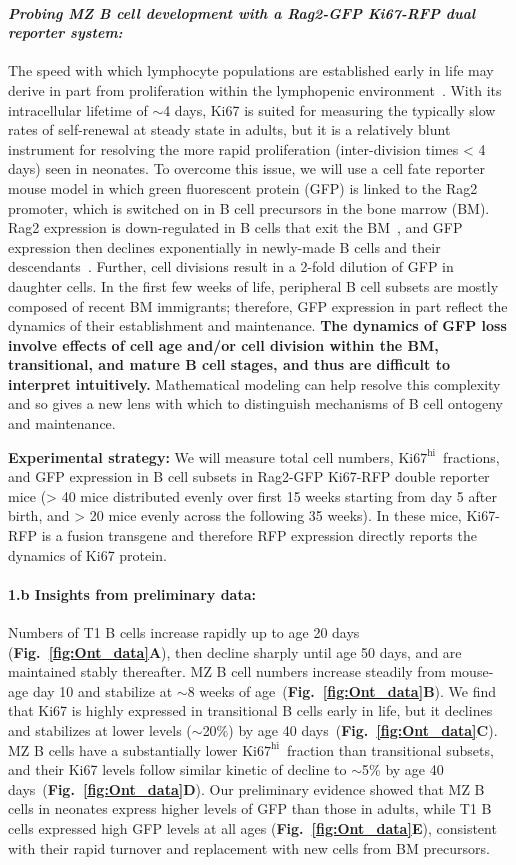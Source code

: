 \documentclass[11pt]{article}
\newcommand{\khi}{\ensuremath{\text{Ki67}^\text{hi}}~}
\newcommand{\para}[1]{\vspace*{-4.5mm}\paragraph{#1}}
\begin{document}
\para{\textit{Probing MZ B cell development with a Rag2-GFP Ki67-RFP dual reporter system: }}
The speed with which lymphocyte populations are established early in life may derive in part from proliferation within the lymphopenic environment~\cite{Min_2003}.
With its intracellular lifetime of $\sim$4 days,  Ki67 is suited for measuring the typically slow rates of self-renewal at steady state in adults, but it is a relatively blunt instrument for resolving the more rapid proliferation (inter-division times < 4 days) seen in neonates. 
To overcome this issue, we will use a cell fate reporter mouse model in which green fluorescent protein (GFP) is linked to the Rag2 promoter, which is switched on in B cell precursors in the bone marrow (BM).
Rag2 expression is down-regulated in B cells that exit the BM~\cite{Grawunder_1995}, and GFP expression then declines exponentially in newly-made B cells and  their descendants~\cite{Yu_1999, Monroe_1999}. 
Further, cell divisions result in a 2-fold dilution of GFP in daughter cells. 
In the first few weeks of life, peripheral B cell subsets are mostly composed of recent BM immigrants; therefore, GFP expression in part reflect the dynamics of their establishment and maintenance. 
\textbf{The dynamics of GFP loss involve effects of cell age and/or cell division within the BM, transitional, and mature B cell stages, and thus are difficult to interpret intuitively.}
Mathematical modeling can help resolve this complexity and so gives a new lens with which to distinguish mechanisms of B cell ontogeny and maintenance. 

\textbf{Experimental strategy:} 
We will measure total cell numbers,  \khi fractions, and GFP expression in B cell subsets in Rag2-GFP Ki67-RFP double reporter mice (> 40 mice distributed evenly over first 15 weeks starting from day 5 after birth, and > 20 mice evenly across the following 35 weeks). 
In these mice, Ki67-RFP is a fusion transgene and therefore RFP expression directly reports the dynamics of Ki67 protein.

\para{{1.b Insights from preliminary data:}}
Numbers of T1 B cells increase rapidly up to age 20 days (\textbf{Fig.~\ref{fig:Ont_data}A}), then decline sharply until age 50 days, and are maintained stably thereafter.
MZ B cell numbers increase steadily from mouse-age day 10 and stabilize at  $\sim$8 weeks of age~(\textbf{Fig.~\ref{fig:Ont_data}B}).
We find that Ki67 is highly expressed in transitional B cells early in life, but it declines and stabilizes at lower levels ($\sim$20\%) by age 40 days~(\textbf{Fig.~\ref{fig:Ont_data}C}).
MZ B cells have a substantially lower \khi fraction than transitional subsets, and their Ki67 levels follow similar kinetic of decline to $\sim$5\% by age 40 days~(\textbf{Fig.~\ref{fig:Ont_data}D}).
Our preliminary evidence showed that MZ B cells in neonates express higher levels of GFP than those in adults, while T1 B cells expressed high GFP levels at all ages (\textbf{Fig.~\ref{fig:Ont_data}E}), consistent with their rapid turnover and replacement with new cells from BM precursors.
\end{document}
